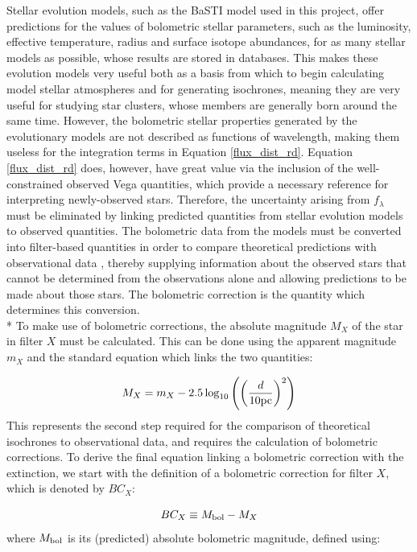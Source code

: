 \documentclass[12pt, a4paper]{report}
\begin{document}
Stellar evolution models, such as the BaSTI model used in this project, offer predictions for the values of bolometric stellar parameters, such as the luminosity, effective temperature, radius and surface isotope abundances, for as many stellar models as possible, whose results are stored in databases. This makes these evolution models very useful both as a basis from which to begin calculating model stellar atmospheres and for generating isochrones, meaning they are very useful for studying star clusters, whose members are generally born around the same time. However, the bolometric stellar properties generated by the evolutionary models are not described as functions of wavelength, making them useless for the integration terms in Equation \ref{flux_dist_rd}. Equation \ref{flux_dist_rd} does, however, have great value via the inclusion of the well-constrained observed Vega quantities, which provide a necessary reference for interpreting newly-observed stars. Therefore, the uncertainty arising from $f_{\lambda}$ must be eliminated by linking predicted quantities from stellar evolution models to observed quantities. The bolometric data from the models must be converted into filter-based quantities in order to compare theoretical predictions with observational data \citep{1996ApJ...469..355F}, thereby supplying information about the observed stars that cannot be determined from the observations alone \citep{2002A&A...391..195G} and allowing predictions to be made about those stars. The bolometric correction is the quantity which determines this conversion.\\*
To make use of bolometric corrections, the absolute magnitude $M_{X}$ of the star in filter $X$ must be calculated. This can be done using the apparent magnitude $m_{X}$ and the standard equation which links the two quantities:

\begin{equation}
M_{X} = m_{X} - 2.5 \log_{10}\left( \left( \frac{d}{10 \textnormal{pc}} \right)^{2} \right)
\label{abs_mag_def}
\end{equation}
This represents the second step required for the comparison of theoretical isochrones to observational data, and requires the calculation of bolometric corrections. To derive the final equation linking a bolometric correction with the extinction, we start with the definition of a bolometric correction for filter $X$, which is denoted by $BC_{X}$:

\begin{equation}
BC_{X} \equiv M_{\textnormal{bol}} - M_{X}
\label{BC_def}
\end{equation}
where $M_{\textnormal{bol}}$ is its (predicted) absolute bolometric magnitude, defined using:
\end{document}
